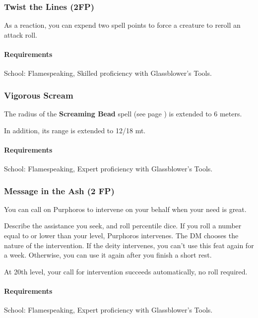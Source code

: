 \subsubsection{Twist the Lines (2FP)} \label{feat::twistthelines}
    As a reaction, you can expend two spell points to force a creature to reroll an attack roll.
    \paragraph{Requirements} School: Flamespeaking, Skilled proficiency with Glassblower's Tools.
\subsubsection{Vigorous Scream} \label{feat::vigorousscream}
    The radius of the \textbf{Screaming Bead} spell (see page \pageref{spell::screamingbead}) is extended to 6 meters.

    In addition, its range is extended to 12/18 mt.
    \paragraph{Requirements} School: Flamespeaking, Expert proficiency with Glassblower's Tools.
\subsubsection{Message in the Ash (2 FP)} \label{feat::messageintheash}
    You can call on Purphoros to intervene on your behalf when your need is great.

    Describe the assistance you seek, and roll percentile dice.
    If you roll a number equal to or lower than your level, Purphoros intervenes.
    The DM chooses the nature of the intervention.
    If the deity intervenes, you can't use this feat again for a week.
    Otherwise, you can use it again after you finish a short rest.

    At 20th level, your call for intervention succeeds automatically, no roll required.
    \paragraph{Requirements} School: Flamespeaking, Expert proficiency with Glassblower's Tools.

